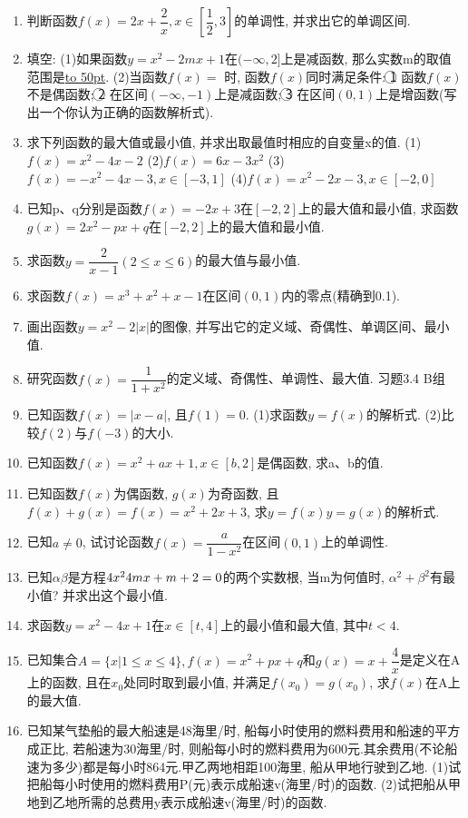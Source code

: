 \documentclass[10pt,a4paper]{article}
\newcommand{\blank}[1]{\underline{\hbox to #1pt{}}}
\begin{document}
\begin{enumerate}[1.]
\item 判断函数$f(x)=2x+\dfrac 2x,x\in [\dfrac 12,3]$的单调性, 并求出它的单调区间.
\item 填空:
(1)如果函数$y=x^2-2mx+1$在$(-\infty ,2]$上是减函数, 那么实数m的取值范围是\blank{50}.
(2)当函数$f(x)=$				时, 函数$f(x)$同时满足条件: \textcircled{1} 函数$f(x)$不是偶函数; \textcircled{2} 在区间$(-\infty ,-1)$上是减函数; \textcircled{3} 在区间$(0,1)$上是增函数(写出一个你认为正确的函数解析式).
\item 求下列函数的最大值或最小值, 并求出取最值时相应的自变量x的值.
(1)$f(x)=x^2-4x-2$
(2)$f(x)=6x-3x^2$
(3)$f(x)=-x^2-4x-3,x\in [-3,1]$
(4)$f(x)=x^2-2x-3,x\in [-2,0]$
\item 已知p、q分别是函数$f(x)=-2x+3$在$[-2,2]$上的最大值和最小值, 求函数$g(x)=2x^2-px+q$在$[-2,2]$上的最大值和最小值.
\item 求函数$y=\dfrac 2{x-1}(2\le x\le 6)$的最大值与最小值.
\item 求函数$f(x)=x^3+x^2+x-1$在区间$(0,1)$内的零点(精确到0.1).
\item 画出函数$y=x^2-2|x|$的图像, 并写出它的定义域、奇偶性、单调区间、最小值.
\item 研究函数$f(x)=\dfrac 1{1+x^2}$的定义域、奇偶性、单调性、最大值.
习题3.4  B组
\item 已知函数$f(x)=|x-a|$, 且$f(1)=0$.
(1)求函数$y=f(x)$的解析式.
(2)比较$f(2)$与$f(-3)$的大小.
\item 已知函数$f(x)=x^2+ax+1,x\in [b,2]$是偶函数, 求a、b的值.
\item 已知函数$f(x)$为偶函数, $g(x)$为奇函数, 且$f(x)+g(x)=f(x)=x^2+2x+3$, 求$y=f(x)y=g(x)$的解析式.
\item 已知$a\ne 0$, 试讨论函数$f(x)=\dfrac a{1-x^2}$在区间$(0,1)$上的单调性.
\item 已知$\alpha \beta$是方程$\text4x^24mx+m+2=0$的两个实数根, 当m为何值时, $\alpha ^2+\beta ^2$有最小值? 并求出这个最小值.
\item 求函数$y=x^2-4x+1$在$x\in [t,4]$上的最小值和最大值, 其中$t<4$.
\item 已知集合$A=\{x|1\le x\le 4\},f(x)=x^2+px+q$和$g(x)=x+\dfrac 4x$是定义在A上的函数, 且在$x_0$处同时取到最小值, 并满足$f(x_0)=g(x_0)$, 求$f(x)$在A上的最大值.
\item 已知某气垫船的最大船速是48海里/时, 船每小时使用的燃料费用和船速的平方成正比, 若船速为30海里/时, 则船每小时的燃料费用为600元.其余费用(不论船速为多少)都是每小时864元.甲乙两地相距100海里, 船从甲地行驶到乙地.
(1)试把船每小时使用的燃料费用P(元)表示成船速v(海里/时)的函数.
(2)试把船从甲地到乙地所需的总费用y表示成船速v(海里/时)的函数.

\end{enumerate}
\end{document}
